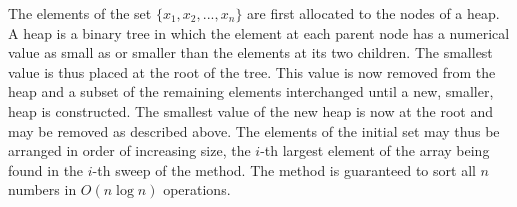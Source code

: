 \documentclass{galahad}
\begin{document}
\noindent
The elements of the set $\{ x_1 ,   x_2 ,  ...  ,  x_n \}$
are first allocated to the nodes of a heap.  A heap is a binary 
tree in which the element at each parent node has a numerical 
value as small as or smaller than the elements at its two children.  
The smallest value is 
thus placed at the root of the tree. This value is now removed from 
the heap and a subset of the remaining elements interchanged until a 
new, smaller, heap is constructed.  The smallest value of the new heap 
is now at the root and may be removed as described above. The elements 
of the initial set may thus be arranged in order of increasing size, 
the $i$-th largest element of the array being found in the $i$-th 
sweep of the method.  The method is guaranteed to sort all $n$ numbers 
in $O( n \log n )$ operations. 

\end{document}
